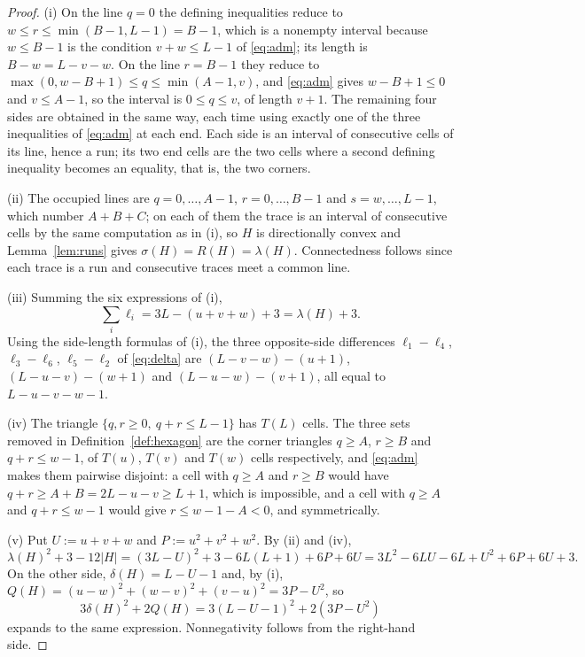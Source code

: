 \documentclass[11pt]{article}
\theoremstyle{plain}
\theoremstyle{definition}
\theoremstyle{remark}
\begin{document}
\begin{proof}
(i) On the line \(q=0\) the defining inequalities reduce to \(w\le r\le\min(B-1,L-1)=B-1\),
which is a nonempty interval because \(w\le B-1\) is the condition \(v+w\le L-1\) of
\eqref{eq:adm}; its length is \(B-w=L-v-w\). On the line \(r=B-1\) they reduce to
\(\max(0,w-B+1)\le q\le\min(A-1,v)\), and \eqref{eq:adm} gives \(w-B+1\le0\) and
\(v\le A-1\), so the interval is \(0\le q\le v\), of length \(v+1\). The remaining four
sides are obtained in the same way, each time using exactly one of the three inequalities
of \eqref{eq:adm} at each end. Each side is an interval of consecutive cells of its line,
hence a run; its two end cells are the two cells where a second defining inequality becomes
an equality, that is, the two corners.

(ii) The occupied lines are \(q=0,\dots,A-1\), \(r=0,\dots,B-1\) and \(s=w,\dots,L-1\),
which number \(A+B+C\); on each of them the trace is an interval of consecutive cells by
the same computation as in (i), so \(H\) is directionally convex and
Lemma~\ref{lem:runs} gives \(\sigma(H)=R(H)=\lambda(H)\). Connectedness follows since each
trace is a run and consecutive traces meet a common line.

(iii) Summing the six expressions of (i),
\[
   \sum_{i}\ell_{i}=3L-(u+v+w)+3=\lambda(H)+3 .
\]
Using the side-length formulas of (i), the three opposite-side differences
\(\ell_{1}-\ell_{4}\), \(\ell_{3}-\ell_{6}\), \(\ell_{5}-\ell_{2}\) of \eqref{eq:delta}
are \((L-v-w)-(u+1)\), \((L-u-v)-(w+1)\) and \((L-u-w)-(v+1)\), all equal to
\(L-u-v-w-1\).

(iv) The triangle \(\{q,r\ge0,\ q+r\le L-1\}\) has \(T(L)\) cells. The three sets removed
in Definition~\ref{def:hexagon} are the corner triangles \(q\ge A\), \(r\ge B\) and
\(q+r\le w-1\), of \(T(u)\), \(T(v)\) and \(T(w)\) cells respectively, and \eqref{eq:adm}
makes them pairwise disjoint: a cell with \(q\ge A\) and \(r\ge B\) would have
\(q+r\ge A+B=2L-u-v\ge L+1\), which is impossible, and a cell with \(q\ge A\) and
\(q+r\le w-1\) would give \(r\le w-1-A<0\), and symmetrically.

(v) Put \(U:=u+v+w\) and \(P:=u^{2}+v^{2}+w^{2}\). By (ii) and (iv),
\[
   \lambda(H)^{2}+3-12|H|=(3L-U)^{2}+3-6L(L+1)+6P+6U
   =3L^{2}-6LU-6L+U^{2}+6P+6U+3 .
\]
On the other side, \(\delta(H)=L-U-1\) and, by (i),
\(Q(H)=(u-w)^{2}+(w-v)^{2}+(v-u)^{2}=3P-U^{2}\), so
\[
   3\delta(H)^{2}+2Q(H)=3(L-U-1)^{2}+2(3P-U^{2})
\]
expands to the same expression. Nonnegativity follows from the right-hand side.
\end{proof}
\end{document}
